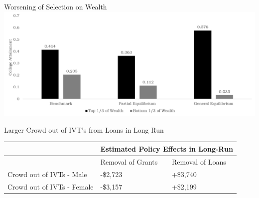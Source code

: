 \documentclass{beamer}
\begin{document}
\begin{frame}{Worsening of Selection on Wealth}
\includegraphics[width=\textwidth]{loanswealth.png}
\end{frame}

\begin{frame}{Larger Crowd out of IVT's from Loans in Long Run}

\begin{table}[]
\centering
\label{my-label}
\begin{tabular}{|l|l|l|}
\hline
                 & \multicolumn{2}{l|}{Estimated Policy Effects in Long-Run} \\ \hline
                 & Removal of Grants      & Removal of Loans     \\ \hline
Crowd out of IVTs - Male & -\$2,723                & +\$3,740              \\ \hline
Crowd out of IVTs - Female & -\$3,157                & +\$2,199              \\ \hline
\end{tabular}
\end{table}
\end{frame}
\end{document}

